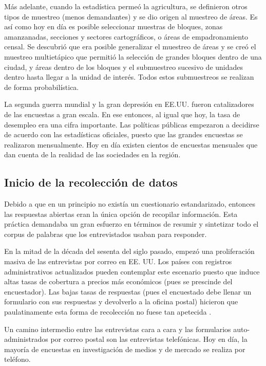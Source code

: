 \documentclass[
  12pt,
  spanish,
]{book}
\begin{document}
Más adelante, cuando la estadística permeó la agricultura, se definieron otros tipos de muestreo (menos demandantes) y se dio origen al muestreo de áreas. Es así como hoy en día es posible seleccionar muestras de bloques, zonas amanzanadas, secciones y sectores cartográficos, o áreas de empadronamiento censal. Se descubrió que era posible generalizar el muestreo de áreas y se creó el muestreo multietápico que permitió la selección de grandes bloques dentro de una ciudad, y áreas dentro de los bloques y el submuestreo sucesivo de unidades dentro hasta llegar a la unidad de interés. Todos estos submuestreos se realizan de forma probabilística.

La segunda guerra mundial y la gran depresión en EE.UU. fueron catalizadores de las encuestas a gran escala. En ese entonces, al igual que hoy, la tasa de desempleo era una cifra importante. Las políticas públicas empezaron a decidirse de acuerdo con las estadísticas oficiales, puesto que las grandes encuestas se realizaron mensualmente. Hoy en día existen cientos de encuestas mensuales que dan cuenta de la realidad de las sociedades en la región.

\hypertarget{inicio-de-la-recolecciuxf3n-de-datos}{%
\subsection{Inicio de la recolección de datos}\label{inicio-de-la-recolecciuxf3n-de-datos}}

Debido a que en un principio no existía un cuestionario estandarizado, entonces las respuestas abiertas eran la única opción de recopilar información. Esta práctica demandaba un gran esfuerzo en términos de resumir y sintetizar todo el corpus de palabras que los entrevistados usaban para responder.

En la mitad de la década del sesenta del siglo pasado, empezó una proliferación masiva de las entrevistas por correo en EE. UU. Los países con registros administrativos actualizados pueden contemplar este escenario puesto que induce altas tasas de cobertura a precios más económicos (pues se prescinde del encuestador). Las bajas tasas de respuestas (pues el encuestado debe llenar un formulario con sus respuestas y devolverlo a la oficina postal) hicieron que paulatinamente esta forma de recolección no fuese tan apetecida \citep{Groves_Fowler_Couper_Lepkowski_Singer_Tourangeau_2009}.

Un camino intermedio entre las entrevistas cara a cara y las formularios auto-administrados por correo postal son las entrevistas telefónicas. Hoy en día, la mayoría de encuestas en investigación de medios y de mercado se realiza por teléfono.
\end{document}

